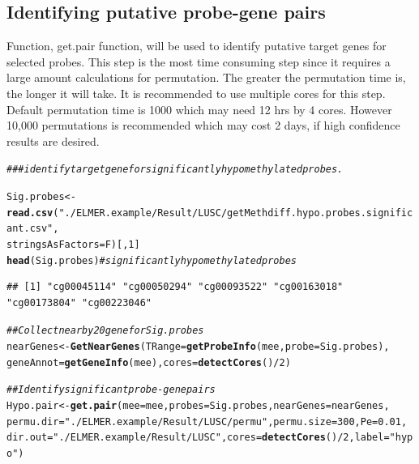 \documentclass{article}\usepackage[]{graphicx}\usepackage[]{color}
\makeatletter
\newcommand{\hlnum}[1]{\textcolor[rgb]{0.686,0.059,0.569}{#1}}%
\newcommand{\hlstr}[1]{\textcolor[rgb]{0.192,0.494,0.8}{#1}}%
\newcommand{\hlcom}[1]{\textcolor[rgb]{0.678,0.584,0.686}{\textit{#1}}}%
\newcommand{\hlopt}[1]{\textcolor[rgb]{0,0,0}{#1}}%
\newcommand{\hlstd}[1]{\textcolor[rgb]{0.345,0.345,0.345}{#1}}%
\newcommand{\hlkwb}[1]{\textcolor[rgb]{0.69,0.353,0.396}{#1}}%
\newcommand{\hlkwc}[1]{\textcolor[rgb]{0.333,0.667,0.333}{#1}}%
\newcommand{\hlkwd}[1]{\textcolor[rgb]{0.737,0.353,0.396}{\textbf{#1}}}%
\newenvironment{kframe}{%
 \def\at@end@of@kframe{}%
 \ifinner\ifhmode%
  \def\at@end@of@kframe{\end{minipage}}%
  \begin{minipage}{\columnwidth}%
 \fi\fi%
 \def\FrameCommand##1{\hskip\@totalleftmargin \hskip-\fboxsep
 \colorbox{shadecolor}{##1}\hskip-\fboxsep
     \hskip-\linewidth \hskip-\@totalleftmargin \hskip\columnwidth}%
 \MakeFramed {\advance\hsize-\width
   \@totalleftmargin\z@ \linewidth\hsize
   \@setminipage}}%
 {\par\unskip\endMakeFramed%
 \at@end@of@kframe}
\newenvironment{knitrout}{}{} %
\makeatother
\begin{document}
\subsection{Identifying putative probe-gene pairs}
Function, get.pair function, will be used to identify putative target genes for selected probes. 
This step is the most time consuming step since it requires a large amount calculations 
for permutation. The greater the permutation time is, the longer it will take. 
It is recommended to use multiple cores for this step. Default permutation time 
is 1000 which may need 12 hrs by 4 cores. However 10,000 permutations is recommended 
which may cost 2 days, if high confidence results are desired.
\begin{knitrout}
\color{fgcolor}\begin{kframe}
\begin{alltt}
\hlcom{### identify target gene for significantly hypomethylated probes.}

\hlstd{Sig.probes} \hlkwb{<-} \hlkwd{read.csv}\hlstd{(}\hlstr{"./ELMER.example/Result/LUSC/getMethdiff.hypo.probes.significant.csv"}\hlstd{,}
                       \hlkwc{stringsAsFactors}\hlstd{=F)[,}\hlnum{1}\hlstd{]}
\hlkwd{head}\hlstd{(Sig.probes)}  \hlcom{# significantly hypomethylated probes}
\end{alltt}
\begin{verbatim}
## [1] "cg00045114" "cg00050294" "cg00093522" "cg00163018" "cg00173804" "cg00223046"
\end{verbatim}
\begin{alltt}
\hlcom{## Collect nearby 20 gene for Sig.probes}
\hlstd{nearGenes} \hlkwb{<-}\hlkwd{GetNearGenes}\hlstd{(}\hlkwc{TRange}\hlstd{=}\hlkwd{getProbeInfo}\hlstd{(mee,}\hlkwc{probe}\hlstd{=Sig.probes),}
                         \hlkwc{geneAnnot}\hlstd{=}\hlkwd{getGeneInfo}\hlstd{(mee),}\hlkwc{cores}\hlstd{=}\hlkwd{detectCores}\hlstd{()}\hlopt{/}\hlnum{2}\hlstd{)}

\hlcom{## Identify significant probe-gene pairs}
\hlstd{Hypo.pair} \hlkwb{<-}\hlkwd{get.pair}\hlstd{(}\hlkwc{mee}\hlstd{=mee,}\hlkwc{probes}\hlstd{=Sig.probes,}\hlkwc{nearGenes}\hlstd{=nearGenes,}
                     \hlkwc{permu.dir}\hlstd{=}\hlstr{"./ELMER.example/Result/LUSC/permu"}\hlstd{,}\hlkwc{permu.size}\hlstd{=}\hlnum{300}\hlstd{,}\hlkwc{Pe} \hlstd{=} \hlnum{0.01}\hlstd{,}
                     \hlkwc{dir.out}\hlstd{=}\hlstr{"./ELMER.example/Result/LUSC"}\hlstd{,}\hlkwc{cores}\hlstd{=}\hlkwd{detectCores}\hlstd{()}\hlopt{/}\hlnum{2}\hlstd{,}\hlkwc{label}\hlstd{=} \hlstr{"hypo"}\hlstd{)}
\end{alltt}



\end{kframe}
\end{knitrout}
\end{document}
